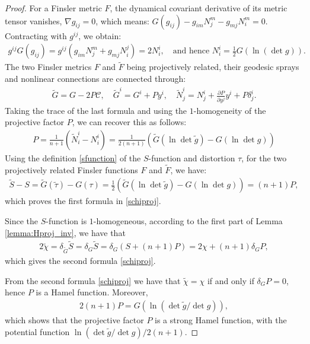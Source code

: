 \documentclass[oneside,english]{amsart}
\theoremstyle{definition}
\theoremstyle{plain}
\theoremstyle{plain}
\theoremstyle{plain}
\theoremstyle{remark}
\theoremstyle{remark}
\theoremstyle{remark}
\begin{document}
\begin{proof}
For a Finsler metric $F$, the dynamical covariant derivative of its
metric tensor vanishes, $\nabla g_{ij}=0$, which means: $G(g_{ij})-g_{im}N_j^m-g_{mj}N_i^m=0$. Contracting with $g^{ij}$, we obtain:
\begin{eqnarray*}
g^{ij}G(g_{ij})=g^{ij}(g_{im}N_j^m+g_{mj}N_i^j)=2N_i^i, \quad
  \textrm{and \ hence \ } 
  N_i^i=\frac{1}{2}G(\ln (\det g) ).
\end{eqnarray*}
The two Finsler metrics $F$ and $\widetilde{F}$ being projectively
related, their geodesic sprays and nonlinear connections are connected through: 
\begin{eqnarray*}
\widetilde{G}=G-2P\mathcal{C}, \quad \widetilde{G}^i=G^i+Py^i, \quad \widetilde{N}^i_j=N^i_j+\frac{\partial P}{\partial y^j}y^i+P\delta^i_j.
\end{eqnarray*}
Taking the trace of the last formula and using the $1$-homogeneity of the projective factor $P$, we can recover this as follows: 
\begin{eqnarray*}
P= \frac{1}{n+1}\left(\widetilde{N}^i_i-N_i^i\right) =
  \frac{1}{2(n+1)}\left(\widetilde{G}(\ln\det \widetilde{g})-G(\ln\det g)\right)
   \label{p1} 
\end{eqnarray*}
Using the definition \eqref{sfunction} of the $S$-function and distortion $\tau$, for the two projectively related Finsler functions $F$ and $\widetilde{F}$, we have:
\begin{eqnarray*}
\widetilde{S}-S=\widetilde{G}(\widetilde{\tau})-G(\tau)=\frac{1}{2}\left(\widetilde{G}(\ln\det \widetilde{g})-G(\ln\det g)\right) = (n+1)P,
\end{eqnarray*}
which proves the first formula in \eqref{schiproj}.

Since the $S$-function is $1$-homogeneous, according to the first part of Lemma \ref{lemma:Hproj_inv}, we have that  
\begin{eqnarray*}
2\widetilde{\chi}=\delta_{\widetilde{G}}\widetilde{S}=\delta_G\widetilde{S}=\delta_G(S+(n+1)P)=2\chi+(n+1)\delta_GP,
\end{eqnarray*}
which gives the second formula \eqref{schiproj}.

From the second formula \eqref{schiproj} we have that $\widetilde{\chi}=\chi$ if and only if $\delta_GP=0$, hence $P$ is a Hamel function. Moreover, 
\begin{eqnarray*}
2(n+1)P=G(\ln(\det \widetilde{g}/\det g)), \label{pdet} 
\end{eqnarray*}
which shows that the projective factor $P$ is a strong Hamel function, with the potential function $\ln(\det \widetilde{g}/\det g)/2(n+1)$.
\end{proof}
\end{document}
